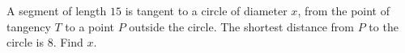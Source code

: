 A segment of length $15$ is tangent to a circle of diameter $x$, from the point of tangency $T$ to a point $P$ outside the circle. The shortest distance from $P$ to the circle is $8$. Find $x$.
